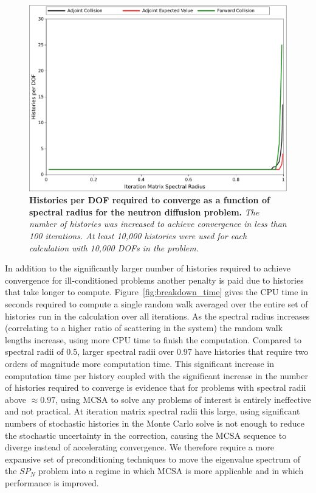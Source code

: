 \begin{figure}[t!]
  \begin{center}
    \includegraphics[width=4.5in]{chapters/spn_equations/breakdown_histories.pdf}
  \end{center}
  \caption{\textbf{Histories per DOF required to converge as a
      function of spectral radius for the neutron diffusion problem.}
    \textit{The number of histories was increased to achieve
      convergence in less than 100 iterations. At least 10,000
      histories were used for each calculation with 10,000 DOFs in the
      problem.}}
  \label{fig:breakdown_histories}
\end{figure}

In addition to the significantly larger number of histories required
to achieve convergence for ill-conditioned problems another penalty is
paid due to histories that take longer to
compute. Figure~\ref{fig:breakdown_time} gives the CPU time in seconds
required to compute a single random walk averaged over the entire set
of histories run in the calculation over all iterations. As the
spectral radius increases (correlating to a higher ratio of scattering
in the system) the random walk lengths increase, using more CPU time
to finish the computation. Compared to spectral radii of 0.5, larger
spectral radii over 0.97 have histories that require two orders of
magnitude more computation time. This significant increase in
computation time per history coupled with the significant increase in
the number of histories required to converge is evidence that for
problems with spectral radii above $\approx 0.97$, using MCSA to solve
any problems of interest is entirely ineffective and not practical. At
iteration matrix spectral radii this large, using significant numbers
of stochastic histories in the Monte Carlo solve is not enough to
reduce the stochastic uncertainty in the correction, causing the MCSA
sequence to diverge instead of accelerating convergence. We therefore
require a more expansive set of preconditioning techniques to move the
eigenvalue spectrum of the $SP_N$ problem into a regime in which MCSA
is more applicable and in which performance is improved.

